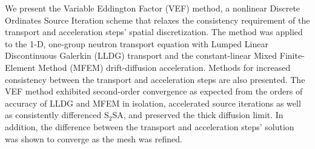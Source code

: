 We present the Variable Eddington Factor (VEF) method, a nonlinear Discrete Ordinates Source Iteration scheme that relaxes the consistency requirement of the transport and acceleration steps' spatial discretization. The method was applied to the 1-D, one-group neutron transport equation with Lumped Linear Discontinuous Galerkin (LLDG) transport and the constant-linear Mixed Finite-Element Method (MFEM) drift-diffusion acceleration. Methods for increased consistency between the transport and acceleration steps are also presented. The VEF method exhibited second-order convergence as expected from the orders of accuracy of LLDG and MFEM in isolation, accelerated source iterations as well as consistently differenced S$_2$SA, and preserved the thick diffusion limit. In addition, the difference between the transport and acceleration steps' solution was shown to converge as the mesh was refined. 